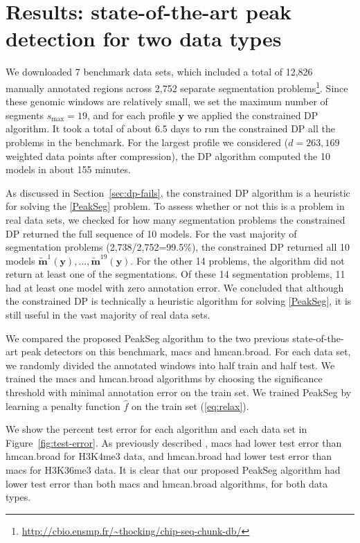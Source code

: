 \documentclass{article}
\begin{document}
\section{Results: state-of-the-art peak detection
  for two data types}
\label{sec:results}

We downloaded 7 benchmark data sets, which included a total of 12,826
manually annotated regions across 2,752 separate segmentation
problems\footnote{\url{http://cbio.ensmp.fr/~thocking/chip-seq-chunk-db/}}.
Since these genomic windows are relatively small, we set the maximum
number of segments $s_{\text{max}}=19$, and for each profile $\mathbf
y$ we applied the constrained DP algorithm. It took a total of about
6.5 days to run the constrained DP all the problems in the
benchmark. For the largest profile we considered ($d=263,169$ weighted
data points after compression), the DP algorithm computed the 10 models
in about 155 minutes.

As discussed in Section~\ref{sec:dp-fails}, the constrained DP algorithm is a
heuristic for solving the \ref{PeakSeg} problem. To assess whether or
not this is a problem in real data sets, we checked for how many
segmentation problems the constrained DP returned the full sequence of
10 models. For the vast majority of segmentation problems
(2,738/2,752=99.5\%), the constrained DP returned all 10 models
$\mathbf{\tilde m}^1(\mathbf y), \dots, \mathbf{\tilde m}^{19}(\mathbf
y)$. For the other 14 problems, the algorithm did not return at least
one of the segmentations. Of these 14 segmentation problems, 11 had at
least one model with zero annotation error. We concluded that although
the constrained DP is technically a heuristic algorithm for solving
\ref{PeakSeg}, it is still useful in the vast majority of real data
sets.


We compared the proposed PeakSeg algorithm to the two previous
state-of-the-art peak detectors on this benchmark, macs and
\mbox{hmcan.broad}. For each data set, we randomly divided the
annotated windows into half train and half test. We trained the macs
and hmcan.broad algorithms by choosing the significance threshold with
minimal annotation error on the train set. We trained PeakSeg by
learning a penalty function $\hat f$ on the train set
(\ref{eq:relax}).

We show the percent test error for each algorithm and each data set in
Figure~\ref{fig:test-error}. As previously described
\citep{hocking2014visual}, macs had lower test error than
\mbox{hmcan.broad} for H3K4me3 data, and \mbox{hmcan.broad} had lower
test error than macs for H3K36me3 data. It is clear that our proposed
PeakSeg algorithm had lower test error than both macs and hmcan.broad
algorithms, for both data types.
\end{document}
